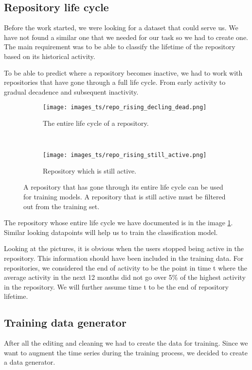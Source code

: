 \documentclass[thesis=M,english]{FITthesis}[2019/12/23]
\begin{document}
\subsection{Repository life cycle}
Before the work started, we were looking for a dataset that could serve us. We have not found a similar one that we needed for our task so we had to create one. The main requirement was to be able to classify the lifetime of the repository based on its historical activity.

To be able to predict where a repository becomes inactive, we had to work with repositories that have gone through a full life cycle. From early activity to gradual decadence and subsequent inactivity. 

\begin{figure*}[h]
    \centering
    \begin{subfigure}[t]{0.5\textwidth}
        \centering
        \texttt{[image: images\_ts/repo\_rising\_decling\_dead.png]}
        \caption{The entire life cycle of a repository.}
        \label{fig:repository_whole_life_cycle}
    \end{subfigure}%
    ~ 
    \begin{subfigure}[t]{0.5\textwidth}
        \centering
        \texttt{[image: images\_ts/repo\_rising\_still\_active.png]}
        \caption{Repository which is still active.}
    \end{subfigure}
    \caption{A repository that has gone through its entire life cycle can be used for training models. A repository that is still active must be filtered out from the training set.}
\end{figure*}

The repository whose entire life cycle we have documented is in the image \ref{fig:repository_whole_life_cycle}. Similar looking datapoints will help us to train the classification model.

Looking at the pictures, it is obvious when the users stopped being active in the repository. This information should have been included in the training data. For repositories, we considered the end of activity to be the point in time t where the average activity in the next 12 months did not go over 5\% of the highest activity in the repository. We will further assume time t to be the end of repository lifetime.

\newpage
\subsection{Training data generator}
\label{label:training_data_generator}
After all the editing and cleaning we had to create the data for training. Since we want to augment the time series during the training process, we decided to create a data generator.
\end{document}
